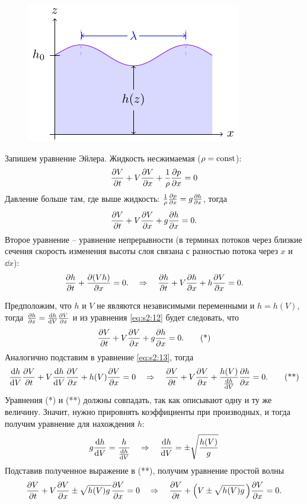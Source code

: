 \begin{figure}[H]
	\centering
	\includegraphics[scale=1.5]{img/diffusion_instability/long_waves}
\end{figure}

Запишем уравнение Эйлера. Жидкость несжимаемая ($\rho=\textrm{const}$): 
\begin{gather*}
	\pdv{V}{t}+V\pdv{V}{x}+\frac1{\rho}\pdv{p}{x}=0
\end{gather*}
Давление больше там, где выше жидкость: $\frac1{\rho}\pdv{p}{x}=g\pdv{h}{x}$, тогда
\begin{equation}
	\pdv{V}{t}+V\pdv{V}{x}+g\pdv{h}{x}=0.
	\label{eq:s2:12}
\end{equation}
Второе уравнение -- уравнение непрерывности (в терминах потоков через близкие сечения скорость изменения высоты слоя связана с разностью потока через $x$ и $\dd x$):
\begin{equation}
	\pdv{h}{t}+\pdv{(Vh)}{x}=0. 
	\quad \Rightarrow \quad
	\pdv{h}{t}+V\pdv{h}{x}+h\pdv{V}{x}=0.
	\label{eq:s2:13}
\end{equation}

Предположим, что $h$ и $V$ не являются независимыми переменными и $h=h(V)$, тогда $\pdv{h}{x}=\dv{h}{V}\pdv{V}{x}$ и из уравнения \eqref{eq:s2:12} будет следовать, что 
\begin{gather*}
	\pdv{V}{t}+V\pdv{V}{x}+g\pdv{h}{x} = 0.
	 \tag{*}
\end{gather*}
Аналогично подставим в уравнение \eqref{eq:s2:13}, тогда
\begin{gather*}
	\dv{h}{V}\pdv{V}{t}+V\dv{h}{V}\pdv{V}{x}+h(V)\pdv{V}{x} = 0
	\quad \Rightarrow \quad
	\pdv{V}{t}+V\pdv{V}{x}+\frac{h(V)}{\dv{h}{V}}\pdv{h}{x} = 0.
	\tag{**}
\end{gather*}
Уравнения (*) и (**) должны совпадать, так как описывают одну и ту же величину. Значит, нужно прировнять коэффициенты при производных, и тогда получим уравнение для нахождения $h$:
\begin{equation*}
	g\dv{h}{V}=\frac{h}{\dv{h}{V}}
	\quad \Rightarrow \quad
	\dv{h}{V}=\pm \sqrt{\frac{h(V)}{g}}
\end{equation*}
Подставив полученное выражение в (**), получим уравнение простой волны
\begin{equation}
	\pdv{V}{t}+V\pdv{V}{x}\pm \sqrt{h(V)g\,} \pdv{V}{x} = 0
	\quad \Rightarrow \quad
	\pdv{V}{t}+\qty(V\pm \sqrt{h(V)g}\,)\pdv{V}{x} = 0.
	\label{eq:s2:14}
\end{equation}

